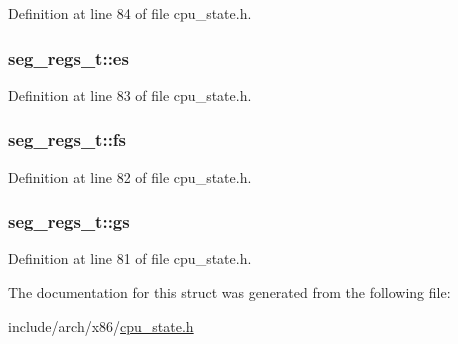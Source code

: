 \-Definition at line 84 of file cpu\-\_\-state.\-h.

\hypertarget{structseg__regs__t_a2cba36244f3431cf78336175e73e9244}{
\subsubsection[{es}]{ {\bf seg\-\_\-regs\-\_\-t\-::es}}}\label{structseg__regs__t_a2cba36244f3431cf78336175e73e9244}


\-Definition at line 83 of file cpu\-\_\-state.\-h.

\hypertarget{structseg__regs__t_a49bcd2ca05a6613d1ed6ff1c1b062940}{
\subsubsection[{fs}]{ {\bf seg\-\_\-regs\-\_\-t\-::fs}}}\label{structseg__regs__t_a49bcd2ca05a6613d1ed6ff1c1b062940}


\-Definition at line 82 of file cpu\-\_\-state.\-h.

\hypertarget{structseg__regs__t_af3c39996499f1c4885ce96121f2fdde7}{
\subsubsection[{gs}]{ {\bf seg\-\_\-regs\-\_\-t\-::gs}}}\label{structseg__regs__t_af3c39996499f1c4885ce96121f2fdde7}


\-Definition at line 81 of file cpu\-\_\-state.\-h.



\-The documentation for this struct was generated from the following file\-:\begin{DoxyCompactItemize}
\item 
include/arch/x86/\hyperlink{cpu__state_8h}{cpu\-\_\-state.\-h}\end{DoxyCompactItemize}
